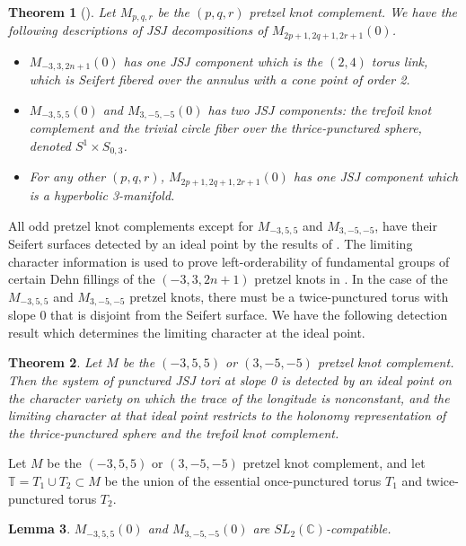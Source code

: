 \documentclass{article}
\theoremstyle{plain}
\newtheorem{theorem}{Theorem}[section]
\theoremstyle{definition}
\theoremstyle{plain}
\theoremstyle{plain}
\theoremstyle{plain}
\newtheorem{lemma}[theorem]{Lemma}
\theoremstyle{remark}
\theoremstyle{remark}
\theoremstyle{plain}
\theoremstyle{plain}
\begin{document}
\begin{theorem}[\cite{sekino}]
Let $M_{p, q, r}$ be the $(p, q, r)$ pretzel knot complement. We have the following descriptions of JSJ decompositions of $M_{2p+1, 2q+1, 2r+1}(0)$. 
\begin{itemize}
	\item $M_{-3, 3, 2n+1}(0)$ has one JSJ component which is the $(2, 4)$ torus link, which is Seifert fibered over the annulus with a cone point of order 2.
	\item $M_{-3, 5, 5}(0)$ and $M_{3, -5, -5}(0)$ has two JSJ components: the trefoil knot complement and the trivial circle fiber over the thrice-punctured sphere, denoted $S^1 \times S_{0, 3}$. 
	\item For any other $(p, q, r)$, $M_{2p+1, 2q+1, 2r+1}(0)$ has one JSJ component which is a hyperbolic 3-manifold. 
\end{itemize}
\end{theorem}

All odd pretzel knot complements except for $M_{-3, 5, 5}$ and $M_{3, -5, -5}$, have their Seifert surfaces detected by an ideal point by the results of \cite{Wang}. The limiting character information is used to prove left-orderability of fundamental groups of certain Dehn fillings of the $(-3, 3, 2n+1)$ pretzel knots in \cite{orderability}. In the case of the $M_{-3, 5, 5}$ and $M_{3, -5, -5}$ pretzel knots, there must be a twice-punctured torus with slope 0 that is disjoint from the Seifert surface. We have the following detection result which determines the limiting character at the ideal point. 

\begin{theorem}\label{thm:pretzels}
Let $M$ be the $(-3, 5, 5)$ or $(3, -5, -5)$ pretzel knot complement. Then the system of punctured JSJ tori at slope 0 is detected by an ideal point on the character variety on which the trace of the longitude is nonconstant, and the limiting character at that ideal point restricts to the holonomy representation of the thrice-punctured sphere and the trefoil knot complement. 
\end{theorem}

Let $M$ be the $(-3, 5, 5)$ or $(3, -5, -5)$ pretzel knot complement, and let $\mathbb{T} = T_1 \cup T_2 \subset M$ be the union of the essential once-punctured torus $T_1$ and twice-punctured torus $T_2$. 

\begin{lemma}\label{lma:pretzels}
$M_{-3, 5, 5}(0)$ and $M_{3, -5, -5}(0)$ are $SL_2(\mathbb{C})$-compatible.
\end{lemma}
\end{document}
